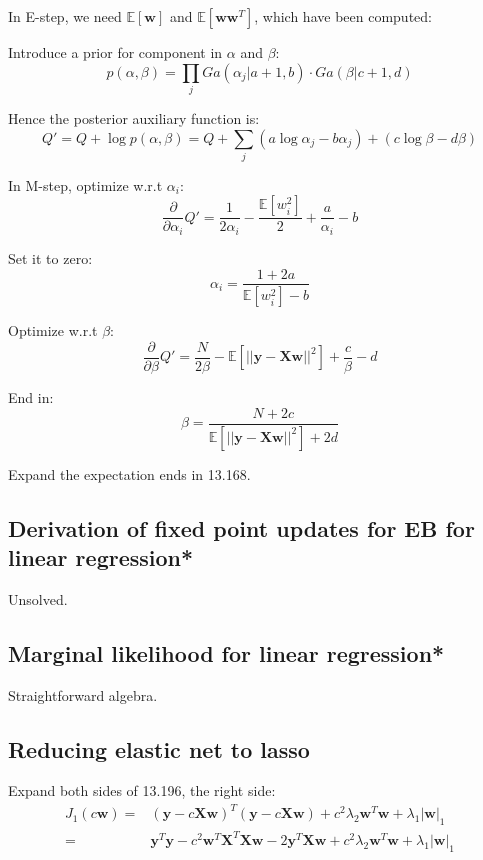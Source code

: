 \documentclass[UTF8]{ctexart}
\begin{document}
In E-step, we need $\mathbb{E}[\textbf{w}]$ and $\mathbb{E}[\textbf{w}\textbf{w}^{T}]$, which have been computed:

Introduce a prior for component in $\alpha$ and $\beta$:
$$p(\alpha,\beta)=\prod_{j}Ga(\alpha_{j}|a+1,b) \cdot Ga(\beta|c+1,d)$$

Hence the posterior auxiliary function is:
$$Q'=Q + \log p(\alpha,\beta) = Q + \sum_{j}(a \log \alpha_{j}-b \alpha_{j}) + (c \log \beta - d \beta)$$

In M-step, optimize w.r.t $\alpha_{i}$:
$$\frac{\partial}{\partial \alpha_{i}} Q'=\frac{1}{2\alpha_{i}}-\frac{\mathbb{E}[w_{i}^{2}]}{2} + \frac{a}{\alpha_{i}} -b$$

Set it to zero:
$$\alpha_{i}=\frac{1+2a}{\mathbb{E}[w_{i}^{2}]-b}$$

Optimize w.r.t $\beta$:
$$\frac{\partial}{\partial \beta}Q'=\frac{N}{2\beta}-\mathbb{E}[||\textbf{y}-\textbf{X}\textbf{w}||^{2}]+\frac{c}{\beta}-d$$

End in:
$$\beta = \frac{N+2c}{\mathbb{E}[||\textbf{y}-\textbf{X}\textbf{w}||^{2}]+2d}$$

Expand the expectation ends in 13.168.

\subsection{Derivation of fixed point updates for EB for linear regression*}
Unsolved.


\subsection{Marginal likelihood for linear regression*}
Straightforward algebra.

\subsection{Reducing elastic net to lasso}
Expand both sides of 13.196, the right side:
\begin{align}
J_{1}(c\textbf{w})=&(\textbf{y}-c\textbf{X}\textbf{w})^{T}(\textbf{y}-c\textbf{X}\textbf{w}) + c^{2}\lambda_{2}\textbf{w}^{T}\textbf{w} + \lambda_{1}|\textbf{w}|_{1}\nonumber \\
=&\textbf{y}^{T}\textbf{y} - c^{2}\textbf{w}^{T}\textbf{X}^{T}\textbf{X}\textbf{w} - 2 \textbf{y}^{T}\textbf{X}\textbf{w} + c^{2}\lambda_{2}\textbf{w}^{T}\textbf{w} + \lambda_{1}|\textbf{w}|_{1}\nonumber
\end{align}
\end{document}
